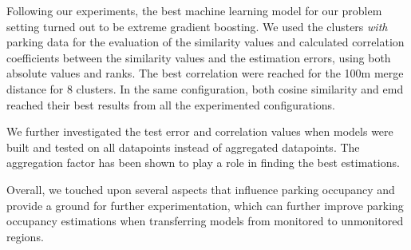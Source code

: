 	Following our experiments, the best machine learning model for our problem setting turned out to be extreme gradient boosting.
	We used the clusters \textit{with} parking data for the evaluation of the similarity values and calculated correlation coefficients between the similarity values and the estimation errors, using both absolute values and ranks.
	The best correlation were reached for the 100m merge distance for 8 clusters.
	In the same configuration, both cosine similarity and emd reached their best results from all the experimented configurations.
	
	We further investigated the test error and correlation values when models were built and tested on all datapoints instead of aggregated datapoints. The aggregation factor has been shown to play a role in finding the best estimations.
	
	Overall, we touched upon several aspects that influence parking occupancy and provide a ground for further experimentation, which can further improve parking occupancy estimations when transferring models from monitored to unmonitored regions.